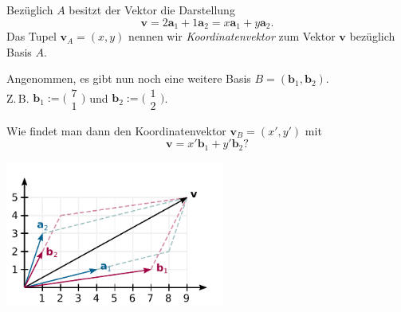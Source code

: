 \documentclass[9pt]{beamer}
\newcommand{\bv}[1]{\mathbf{#1}}
\newcommand{\icol}[1]{
  \big(\!\begin{smallmatrix}#1\end{smallmatrix}\!\big)%
}
\newcommand{\parspace}{\vspace{0.8em}}
\begin{document}
\begin{frame}[t]
\vspace{4em}
Bezüglich $A$ besitzt der Vektor die Darstellung
\[\bv v = 2\bv a_1 + 1\bv a_2 = x\bv a_1 + y\bv a_2.
\]\pause
Das Tupel $\bv v_A = (x,y)$ nennen wir \emph{Koordinatenvektor}
zum Vektor $\bv v$ bezüglich Basis $A$.\pause

\parspace
Angenommen, es gibt nun noch eine weitere Basis $B=(\bv b_1,\bv b_2)$.\\
Z.\,B. $\bv b_1:=\icol{7\\ 1}$ und $\bv b_2:=\icol{1\\ 2}$.\pause

\vspace{1.2em}
Wie findet man dann den Koordinatenvektor $\bv v_B=(x',y')$ mit
\[\bv v = x'\bv b_1 + y'\bv b_2?\]
\end{frame}

\begin{frame}
\begin{center}
\includegraphics[width=72mm]{img/Vektor-in-Basis-AB.pdf}
\end{center}
\end{frame}
\end{document}
